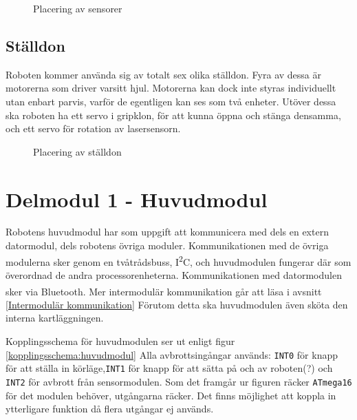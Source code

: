 \documentclass[11pt]{article}
\begin{document}
\begin{flushleft}
\begin{figure}[htbp]
\centering
\noindent\resizebox{.8\linewidth}{!}{
	}
	\caption{Placering av sensorer \label{sensor}}	
\end{figure}

\subsection{Ställdon}
Roboten kommer använda sig av totalt sex olika ställdon. Fyra av dessa är motorerna som driver varsitt hjul. Motorerna kan dock inte styras individuellt utan enbart parvis, varför de egentligen kan ses som två enheter. Utöver dessa ska roboten ha ett servo i gripklon, för att kunna öppna och stänga densamma, och ett servo för rotation av lasersensorn.

\begin{figure}[htbp]
\centering
\noindent\resizebox{.8\linewidth}{!}{
	}
	\caption{Placering av ställdon \label{ställdon}}	
\end{figure}

\clearpage
\section{Delmodul 1 - Huvudmodul}
Robotens huvudmodul har som uppgift att kommunicera med dels en extern datormodul, dels robotens övriga moduler. Kommunikationen med de övriga modulerna sker genom en tvåtrådsbuss, I\textsuperscript{2}C, och huvudmodulen fungerar där som överordnad de andra processorenheterna. Kommunikationen med datormodulen sker via  Bluetooth\textsuperscript{\circledR}. Mer intermodulär kommunikation går att läsa i avsnitt \ref{Intermodulär kommunikation} Förutom detta ska huvudmodulen även sköta den interna kartläggningen. 

Kopplingsschema för huvudmodulen ser ut enligt figur \ref{kopplingsschema:huvudmodul} Alla avbrottsingångar används: \verb+INT0+ för knapp för att ställa in körläge,\verb+INT1+ för knapp för att sätta på och av roboten(?) och \verb+INT2+ för avbrott från sensormodulen. Som det framgår ur figuren räcker \verb+ATmega16+ för det modulen behöver, utgångarna räcker. Det finns möjlighet att koppla in ytterligare funktion då flera utgångar ej används.  


\end{flushleft}
\end{document}

